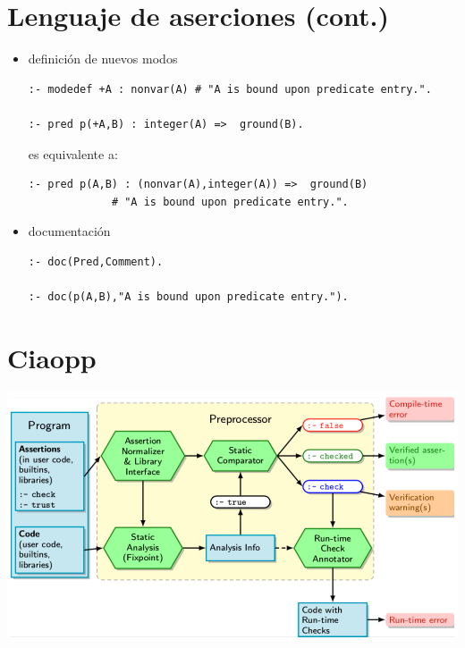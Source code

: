 \documentclass[11pt]{article}
\begin{document}
\section*{Lenguaje de aserciones (cont.)}
\label{sec:org0360769}

\begin{itemize}
\item definición de nuevos modos

\begin{verbatim}
:- modedef +A : nonvar(A) # "A is bound upon predicate entry.".

:- pred p(+A,B) : integer(A) =>  ground(B).
\end{verbatim}
es equivalente a:
\begin{verbatim}
:- pred p(A,B) : (nonvar(A),integer(A)) =>  ground(B)
			 # "A is bound upon predicate entry.".
\end{verbatim}

\item documentación 

\begin{verbatim}
:- doc(Pred,Comment). 

:- doc(p(A,B),"A is bound upon predicate entry.").
\end{verbatim}
\end{itemize}


\section*{Ciaopp}
\label{sec:org41e7bcc}

\begin{center}
\includegraphics[width=.9\linewidth]{arquitectura.png}
\end{center}
\end{document}

